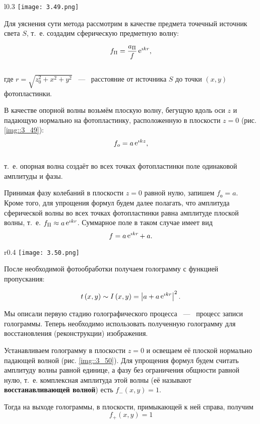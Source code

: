 \begin{wrapfigure}{l}{0.3\linewidth}
  \texttt{[image: 3.49.png]}
  \caption{Запись голограммы точечного источника}
  \label{img::3_49}
\end{wrapfigure}

Для уяснения сути метода рассмотрим в качестве предмета точечный источник света $S$, т.~е. создадим сферическую предметную волну:

$$
f_{\Pi} = \frac{a_{\Pi}}{f} \mathop{\mathrm e}\nolimits^{\imath kr},
$$\\
где $r = \sqrt{z_0^2 + x^2 + y^2}$ ~---~ расстояние от источника $S$ до точки $\left( x, y \right)$ фотопластинки. 

В качестве опорной волны возьмём плоскую волну, бегущую вдоль оси $z$ и падающую нормально на фотопластинку, расположенную в плоскости 
$z = 0$ (рис. \ref{img::3_49}):
$$
f_o = a \mathop{\mathrm e}\nolimits^{\imath kz},
$$\\
т.~е. опорная волна создаёт во всех точках фотопластинки поле одинаковой амплитуды и фазы.

Принимая фазу колебаний в плоскости $z = 0$ равной нулю, запишем $f_о = a$. 
Кроме того, для упрощения формул будем далее полагать, что амплитуда сферической волны во всех точках фотопластинки равна амплитуде плоской волны, 
т.~е. $f_{\Pi} \approx a\mathop{\mathrm e}\nolimits^{\imath kr}$. Суммарное поле в таком случае имеет вид
$$
f = a\mathop{\mathrm e}\nolimits^{\imath kr} + \: a.
$$
\newpage
\begin{wrapfigure}{r}{0.4\linewidth}
  \texttt{[image: 3.50.png]}
  \caption{Восстановление голограммы точечного источника}
  \label{img::3_50}
\end{wrapfigure}
После необходимой фотообработки получаем голограмму с
функцией пропускания:

\begin{equation}\label{eq::3.83}
t\left(x, y\right) \sim I\left(x, y\right)  = 
\left|a +  a\mathop{\mathrm e}\nolimits^{\imath kr}\right|^2.
\end{equation}

Мы описали первую стадию голографического процесса ~---~ процесс записи голограммы.
Теперь необходимо использовать полученную голограмму для восстановления (реконструкции) изображения.

Устанавливаем голограмму в плоскости $z = 0$ и освещаем её плоской нормально падающей волной (рис. \ref{img::3_50}). Для упрощения формул
будем считать амплитуду волны равной единице, а фазу без ограничения общности равной нулю, т.~е. комплексная амплитуда этой волны (её
называют \textbf{восстанавливающей волной}) есть $f_-(x,y) = 1$.

Тогда на выходе голограммы, в плоскости, примыкающей к ней справа, получим
\begin{equation}\label{eq::3.84}
  f_+(x,y) = 1
\end{equation}